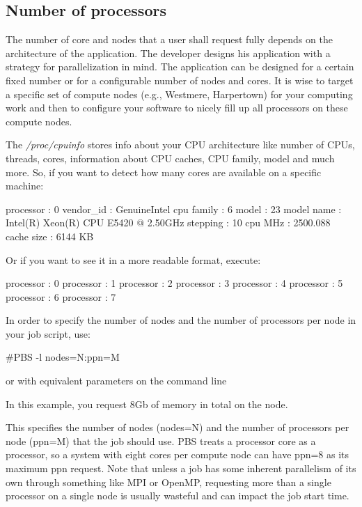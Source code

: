 \subsection{Number of processors}

The number of core and nodes that a user shall request fully depends on the
architecture of the application. The developer designs his application with a
strategy for parallelization in mind. The application can be designed for a
certain fixed number or for a configurable number of nodes and cores. It is
wise to target a specific set of compute nodes (e.g., Westmere, Harpertown) for
your computing work and then to configure your software to nicely fill up all
processors on these compute nodes.

The \emph{/proc/cpuinfo} stores info about your CPU architecture like number of
CPUs, threads, cores, information about CPU caches, CPU family, model and much
more.  So, if you want to detect how many cores are available on a specific
machine:

\begin{prompt}
processor       : 0
vendor_id       : GenuineIntel
cpu family      : 6
model           : 23
model name      : Intel(R) Xeon(R) CPU  E5420  @ 2.50GHz
stepping        : 10
cpu MHz         : 2500.088
cache size      : 6144 KB
\end{prompt}

Or if you want to see it in a more readable format, execute:

\begin{prompt}
processor : 0
processor : 1
processor : 2
processor : 3
processor : 4
processor : 5
processor : 6
processor : 7
\end{prompt}


In order to specify the number of nodes and the number of processors per node in your job script, use:

\begin{prompt}
#PBS -l nodes=N:ppn=M
\end{prompt}

or with equivalent parameters on the command line

\begin{prompt}
\end{prompt}

In this example, you request 8Gb of memory in total on the node.

This specifies the number of nodes (nodes=N) and the number of processors per
node (ppn=M) that the job should use. PBS treats a processor core as a
processor, so a system with eight cores per compute node can have ppn=8 as its
maximum ppn request. Note that unless a job has some inherent parallelism of
its own through something like MPI or OpenMP, requesting more than a single
processor on a single node is usually wasteful and can impact the job start
time.

